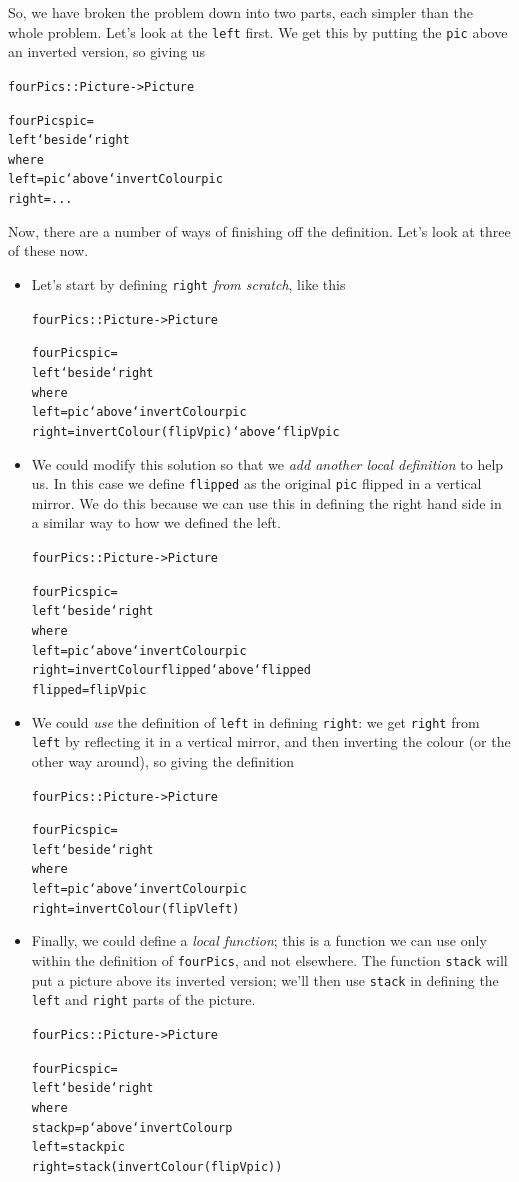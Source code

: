 So, we have broken the problem down into two parts, each simpler than the whole problem. Let's look at the \texttt{left} first. We get this by putting the \texttt{pic} above an inverted version, so giving us
\begin{alltt}
fourPics :: Picture -> Picture

fourPics pic =
    left `beside` right
      where
        left  = pic `above` invertColour pic
        right = ...
\end{alltt}
Now, there are a number of ways of finishing off the definition. Let's look at three of these now.
\begin{itemize}
\item
Let's start by defining \texttt{right} \emph{from scratch}, like this
\begin{alltt}
fourPics :: Picture -> Picture

fourPics pic =
    left `beside` right
      where
        left  = pic `above` invertColour pic
        right = invertColour (flipV pic) `above` flipV pic
\end{alltt}
\item
We could modify this solution so that we \emph{add another local definition} to help us. In this case we define \texttt{flipped} as the original \texttt{pic} flipped in a vertical mirror. We do this because we can use this in defining the right hand side in a similar way to how we defined the left.
\begin{alltt}
fourPics :: Picture -> Picture

fourPics pic =
    left `beside` right
      where
        left    = pic `above` invertColour pic
        right   = invertColour flipped `above` flipped
        flipped = flipV pic
\end{alltt}
\item
We could \emph{use} the definition of \texttt{left} in defining \texttt{right}: we get \texttt{right} from \texttt{left} by reflecting it in a vertical mirror, and then inverting the colour (or the other way around), so giving the definition
\begin{alltt}
fourPics :: Picture -> Picture

fourPics pic =
    left `beside` right
      where
        left  = pic `above` invertColour pic
        right = invertColour (flipV left)
\end{alltt}
\item
Finally, we could  define a \emph{local function}; this is a function we can use only within the definition of \texttt{fourPics}, and not elsewhere. The function \texttt{stack} will put a picture above its inverted version; we'll then use \texttt{stack} in defining the \texttt{left} and \texttt{right} parts of the picture.
\begin{alltt}
fourPics :: Picture -> Picture

fourPics pic =
    left `beside` right
      where
        stack p  = p `above` invertColour p
        left     = stack pic
        right    = stack (invertColour (flipV pic))
\end{alltt}

\end{itemize}
